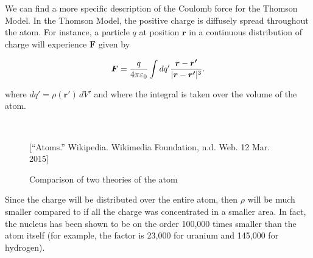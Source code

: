 We can find a more specific description of the Coulomb force for the Thomson Model. In the Thomson Model, the positive charge is diffusely spread throughout the atom. For instance, a particle $q$ at position $\boldsymbol{r}$ in a continuous distribution of charge will experience $\boldsymbol{F}$ given by

\begin{equation}
   \boldsymbol{F} = {q\over 4\pi\varepsilon_0}\int dq' {\boldsymbol{r} - \boldsymbol{r'} \over |\boldsymbol{r} - \boldsymbol{r'}|^3}.
   \label{Continuous Coulomb}
\end{equation}

where $dq' = \rho(\boldsymbol{r'})\,dV'$ and where the integral is taken over the volume of the atom.

\begin{figure}[hh]
  \begin{center}
    \\
  \end{center}
  \caption{Comparison of two theories of the atom}[\footnotesize{``Atoms.'' Wikipedia. Wikimedia Foundation, n.d. Web. 12 Mar. 2015}]
  \label{models}
\end{figure}

Since the charge will be distributed over the entire atom, then $\rho$ will be much smaller compared to if all the charge was concentrated in a smaller area. In fact, the nucleus has been shown to be on the order 100,000 times smaller than the atom itself (for example, the factor is 23,000 for uranium and 145,000 for hydrogen).

